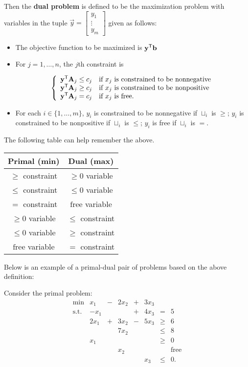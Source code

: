Then the \textbf{dual problem} is defined to be the maximization problem
with variables in the tuple
\(\vec{y} = \begin{bmatrix} y_1\\ \vdots\\ y_m\end{bmatrix}\) given as
follows:

\begin{itemize}
\item
  The objective function to be maximized is \(\mathbf{y}^{\mathsf{T}} \mathbf{b}\)
\item
  For \(j = 1,\ldots, n\), the \(j\)th constraint is

  \begin{equation*}
  \left \{\begin{array}{ll}
  \mathbf{y}^{\mathsf{T}}\mathbf{A}_j \leq c_j & \mbox{if } x_j \mbox{ is constrained to 
  be nonnegative} \\
  \mathbf{y}^{\mathsf{T}}\mathbf{A}_j \geq c_j & \mbox{if } x_j \mbox{ is constrained to 
  be nonpositive} \\
  \mathbf{y}^{\mathsf{T}}\mathbf{A}_j = c_j & \mbox{if } x_j \mbox{ is free}.
  \end{array}\right.
  \end{equation*}
\item
  For each \(i \in \{1,\ldots,m\}\), \(y_i\) is constrained to be
  nonnegative if \(\sqcup_i\) is \(\geq\); \(y_i\) is constrained to be
  nonpositive if \(\sqcup_i\) is \(\leq\); \(y_i\) is free if
  \(\sqcup_i\) is \(=\).
\end{itemize}

The following table can help remember the above.

\begin{longtable}[]{@{}cc@{}}
\toprule
Primal (min) & Dual (max)\tabularnewline
\midrule
\endhead
\(\geq\) constraint & \(\geq 0\) variable\tabularnewline
\(\leq\) constraint & \(\leq 0\) variable\tabularnewline
\(=\) constraint & \(\text{free}\) variable\tabularnewline
\(\geq 0\) variable & \(\leq\) constraint\tabularnewline
\(\leq 0\) variable & \(\geq\) constraint\tabularnewline
\(\text{free}\) variable & \(=\) constraint\tabularnewline
\bottomrule
\end{longtable}

Below is an example of a primal-dual pair of problems based on the above
definition:

Consider the primal problem: \[\begin{array}{rrcrcrcl}
\mbox{min} &  x_1 & - & 2x_2 & + & 3x_3 & \\
\mbox{s.t.} & -x_1 &   &      & + & 4x_3 &  =   &5 \\
            & 2x_1 & + & 3x_2 & - & 5x_3 & \geq &  6 \\
            &      &   & 7x_2 &   &      & \leq &  8 \\
            &  x_1 &   &      &   &      & \geq &  0 \\
            &     &    & x_2  &   &      & &      \mbox{free} \\
            &     &    &      &   & x_3  & \leq & 0.\\
\end{array}\]

